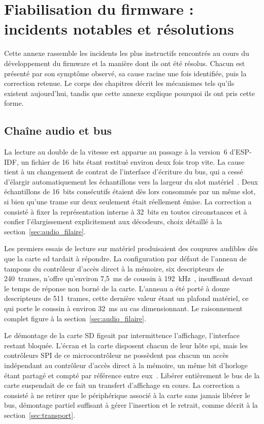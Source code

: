 \chapter{Fiabilisation du firmware : incidents notables et résolutions}
\label{ann:fiabilisation}

Cette annexe rassemble les incidents les plus instructifs rencontrés au cours du développement du firmware et la manière dont ils ont été résolus. Chacun est présenté par son symptôme observé, sa cause racine une fois identifiée, puis la correction retenue. Le corps des chapitres décrit les mécanismes tels qu'ils existent aujourd'hui, tandis que cette annexe explique pourquoi ils ont pris cette forme.

\section{Chaîne audio et bus}

La lecture au double de la vitesse est apparue au passage à la version~6 d'ESP-IDF, un fichier de 16~bits étant restitué environ deux fois trop vite. La cause tient à un changement de contrat de l'interface d'écriture du bus, qui a cessé d'élargir automatiquement les échantillons vers la largeur du \gls{slot} matériel~\cite{ESP32_IDF_migration_v6}. Deux échantillons de 16~bits consécutifs étaient dès lors consommés par un même slot, si bien qu'une trame sur deux seulement était réellement émise. La correction a consisté à fixer la représentation interne à 32~bits en toutes circonstances et à confier l'élargissement explicitement aux décodeurs, choix détaillé à la section~\ref{sec:audio_filaire}.

Les premiers essais de lecture sur matériel produisaient des coupures audibles dès que la carte \gls{sd} tardait à répondre. La configuration par défaut de l'anneau de tampons du contrôleur d'accès direct à la mémoire, six descripteurs de 240~trames, n'offre qu'environ 7,5~ms de coussin à 192~kHz~\cite{ESP32_IDF_i2s}, insuffisant devant le temps de réponse non borné de la carte. L'anneau a été porté à douze descripteurs de 511~trames, cette dernière valeur étant un plafond matériel, ce qui porte le coussin à environ 32~ms au cas dimensionnant. Le raisonnement complet figure à la section~\ref{sec:audio_filaire}.

Le démontage de la carte SD figeait par intermittence l'affichage, l'interface restant bloquée. L'écran et la carte disposent chacun de leur hôte \gls{spi}, mais les contrôleurs SPI de ce microcontrôleur ne possèdent pas chacun un accès indépendant au contrôleur d'accès direct à la mémoire, un même bit d'horloge étant partagé et compté par référence entre eux~\cite{ESP32_Technical_Reference_Manual}. Libérer entièrement le bus de la carte suspendait de ce fait un transfert d'affichage en cours. La correction a consisté à ne retirer que le périphérique associé à la carte sans jamais libérer le bus, démontage partiel suffisant à gérer l'insertion et le retrait, comme décrit à la section~\ref{sec:transport}.

